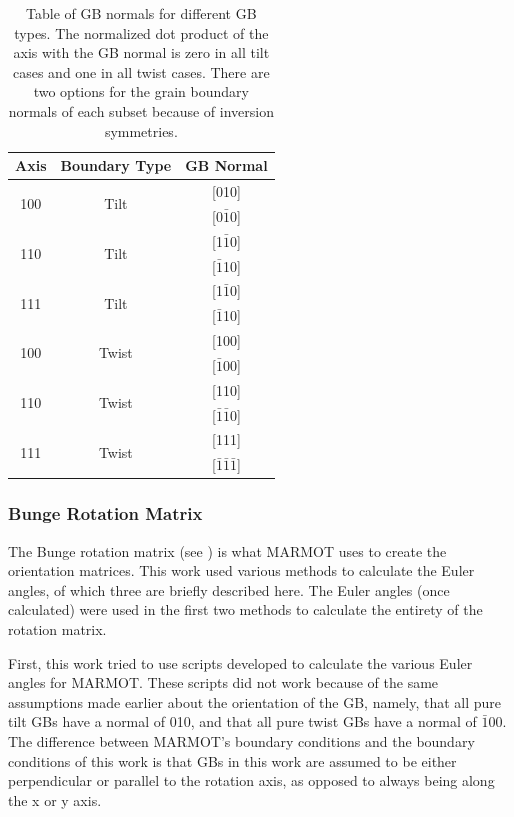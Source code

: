 \documentclass[12pt]{report}
\begin{document}
\begin{table}[ht!]
\centering
\caption{\label{table:geometricgbnorms}Table of GB normals for different GB types. The normalized dot product of the axis with the GB normal is zero in all tilt cases and one in all twist cases.  There are two options for the grain boundary normals of each subset because of inversion symmetries.}

\begin{tabular}{ccc}
Axis & Boundary Type & GB Normal \\
\hline
\hline
\multirow{2}{*}{\textlangle{}100\textrangle{}} & \multirow{2}{*}{Tilt} & [010] \\
                              & & [0$\bar{1}$0] \\
\hline
\multirow{2}{*}{\textlangle{}110\textrangle{}} & \multirow{2}{*}{Tilt} & [1$\bar{1}$0] \\
							  & & [$\bar{1}$10] \\
\hline
\multirow{2}{*}{\textlangle{}111\textrangle{}} & \multirow{2}{*}{Tilt} & [1$\bar{1}$0] \\
							  & & [$\bar{1}$10] \\
\hline
\multirow{2}{*}{\textlangle{}100\textrangle{}} & \multirow{2}{*}{Twist} & [100] \\
							  & & [$\bar{1}$00] \\
\hline
\multirow{2}{*}{\textlangle{}110\textrangle{}} & \multirow{2}{*}{Twist} & [110] \\
							  & & [$\bar{1}\bar{1}$0] \\
\hline
\multirow{2}{*}{\textlangle{}111\textrangle{}} & \multirow{2}{*}{Twist} & [111] \\
							  & & [$\bar{1}\bar{1}\bar{1}$] \\
\hline
\hline
\end{tabular}
\end{table}

\subsubsection{Bunge Rotation Matrix\label{PQ:BungeMat}}
The Bunge rotation matrix (see ) is what MARMOT uses to create the orientation matrices.  This work used various methods to calculate the Euler angles, of which three are briefly described here. The Euler angles (once calculated) were used in the first two methods to calculate the entirety of the rotation matrix.

First, this work tried to use scripts developed to calculate the various Euler angles for MARMOT.  These scripts did not work because of the same assumptions made earlier about the orientation of the GB, namely, that all pure tilt GBs have a normal of 010, and that all pure twist GBs have a normal of $\bar{1}$00.  The difference between MARMOT's boundary conditions and the boundary conditions of this work is that GBs in this work are assumed to be either perpendicular or parallel to the rotation axis, as opposed to always being along the x or y axis.
\end{document}
